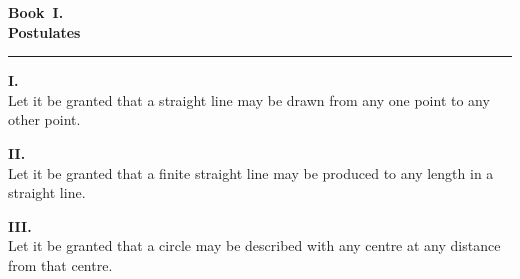 \documentclass[12pt]{article}
\begin{document}
\begin{center}
  {\large\textbf{Book~I.}}\\[4pt]
  {\Large\textbf{Postulates}}
\end{center}

\vspace{0.4cm}
\noindent\rule{\linewidth}{0.4pt}
\vspace{0.6cm}

\begin{center}
\textbf{I.}\\[6pt]
Let it be granted that a straight line may be drawn from any one point
to any other point.
\end{center}

\vspace{0.8cm}

\begin{center}
\textbf{II.}\\[6pt]
Let it be granted that a finite straight line may be produced to any
length in a straight line.
\end{center}

\vspace{0.8cm}

\begin{center}
\textbf{III.}\\[6pt]
Let it be granted that a circle may be described with any centre at any
distance from that centre.
\end{center}
\end{document}
